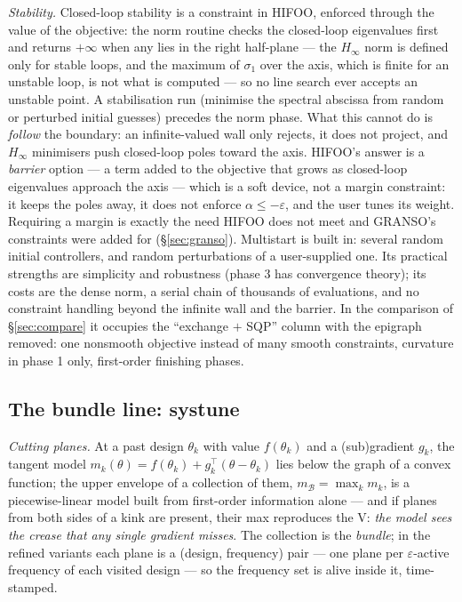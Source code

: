 \documentclass[11pt,a4paper]{article}
\newcommand{\eps}{\varepsilon}
\newcommand{\T}{^{\!\top}}
\begin{document}
{\emph{Stability.}  Closed-loop stability is a constraint in HIFOO, enforced through the
value of the objective: the norm routine checks the closed-loop eigenvalues first and
returns $+\infty$ when any lies in the right half-plane --- the $H_\infty$ norm is
defined only for stable loops, and the maximum of $\sigma_1$ over the axis, which is
finite for an unstable loop, is not what is computed --- so no line search ever accepts
an unstable point.  A stabilisation run (minimise the spectral abscissa from random or
perturbed initial guesses) precedes the norm phase.  What this cannot do is
\emph{follow} the boundary: an infinite-valued wall only rejects, it does not project,
and $H_\infty$ minimisers push closed-loop poles toward the axis.  HIFOO's answer is a
\emph{barrier} option --- a term added to the objective that grows as closed-loop
eigenvalues approach the axis --- which is a soft device, not a margin constraint: it
keeps the poles away, it does not enforce $\alpha\le-\eps$, and the user tunes its
weight.  Requiring a margin is exactly the need HIFOO does not meet and GRANSO's
constraints were added for (\S\ref{sec:granso}).  Multistart is built in: several random
initial controllers, and random perturbations of a user-supplied one.  Its practical
strengths are simplicity and robustness (phase 3 has convergence theory); its costs are
the dense norm, a serial chain of thousands of evaluations, and no constraint handling
beyond the infinite wall and the barrier.  In the comparison of \S\ref{sec:compare} it
occupies the ``exchange $+$ SQP'' column with the epigraph removed: one nonsmooth
objective instead of many smooth constraints, curvature in phase 1 only, first-order
finishing phases.}

\subsection{The bundle line: \textsf{systune}}
\label{sec:bundle}
\emph{Cutting planes.}  At a past design $\theta_k$ with value $f(\theta_k)$ and a
(sub)gradient $g_k$, the tangent model $m_k(\theta)=f(\theta_k)+g_k\T(\theta-\theta_k)$
lies below the graph of a convex function; the upper envelope of a collection of them,
$m_{\mathcal B}=\max_km_k$, is a piecewise-linear model built from first-order
information alone --- and if planes from both sides of a kink are present, their max
reproduces the V: \emph{the model sees the crease that any single gradient misses}.  The
collection is the \emph{bundle}; in the refined variants each plane is a
(design, frequency) pair --- one plane per $\eps$-active frequency of each visited design
--- so the frequency set is alive inside it, time-stamped.
\end{document}
